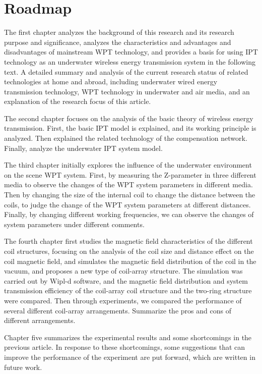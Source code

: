 \section{Roadmap}
The first chapter analyzes the background of this research and its research purpose and significance, analyzes the characteristics and advantages and disadvantages of mainstream WPT technology, and provides a basis for using IPT technology as an underwater wireless energy transmission system in the following text. A detailed summary and analysis of the current research status of related technologies at home and abroad, including underwater wired energy transmission technology, WPT technology in underwater and air media, and an explanation of the research focus of this article.

The second chapter focuses on the analysis of the basic theory of wireless energy transmission. First, the basic IPT model is explained, and its working principle is analyzed. Then explained the related technology of the compensation network. Finally, analyze the underwater IPT system model.

The third chapter initially explores the influence of the underwater environment on the scene WPT system. First, by measuring the Z-parameter in three different media to observe the changes of the WPT system parameters in different media. Then by changing the size of the internal coil to change the distance between the coils, to judge the change of the WPT system parameters at different distances. Finally, by changing different working frequencies, we can observe the changes of system parameters under different comments.

The fourth chapter first studies the magnetic field characteristics of the different coil structures, focusing on the analysis of the coil size and distance effect on the coil magnetic field, and simulates the magnetic field distribution of the coil in the vacuum, and proposes a new type of coil-array structure. The simulation was carried out by Wipl-d software, and the magnetic field distribution and system transmission efficiency of the coil-array coil structure and the two-ring structure were compared. Then through experiments, we compared the performance of several different coil-array arrangements. Summarize the pros and cons of different arrangements.

Chapter five summarizes the experimental results and some shortcomings in the previous article. In response to these shortcomings, some suggestions that can improve the performance of the experiment are put forward, which are written in future work.